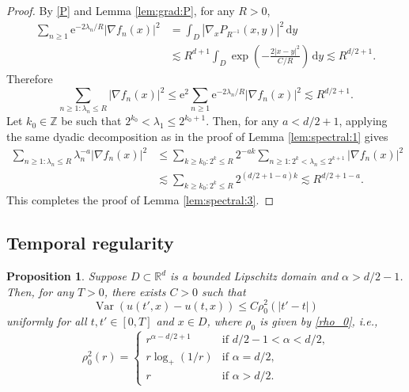 \documentclass[reqno]{amsart}
\DeclareMathOperator{\Var}{Var}
\newcommand{\R}{\mathbb R}
\renewcommand{\d}{\mathrm d}
\newcommand{\e}{\mathrm e}
\newcommand{\1}{\mathbf 1}
\numberwithin{equation}{section}
\newtheorem{proposition}[theorem]{Proposition}
\theoremstyle{definition}
\begin{document}
\begin{proof}
By \eqref{P} and Lemma \ref{lem:grad:P}, for any $R > 0$,
\[
\begin{aligned}
    \sum_{n \ge 1}\e^{-2\lambda_n/R}|\nabla f_n(x)|^2
    &=
    \int_D|\nabla_x P_{R^{-1}}(x,y)|^2\,\d y        \\
    &\lesssim
    R^{d+1}
    \int_D
    \exp\left(-\frac{2|x-y|^2}{C/R}\right)\,\d y    
    \lesssim R^{d/2+1}.
\end{aligned}
\]
Therefore
\[
    \sum_{n \ge 1: \lambda_n\le R}|\nabla f_n(x)|^2
    \le
    \e^2\sum_{n \ge 1} \e^{-2\lambda_n/R}|\nabla f_n(x)|^2
    \lesssim R^{d/2+1}.
\]
Let $k_0 \in \mathbb{Z}$ be such that $2^{k_0} < \lambda_1 \le 2^{k_0+1}$.
Then, for any $a<d/2+1$, applying the same dyadic decomposition as in the proof of Lemma \ref{lem:spectral:1} gives
\[
\begin{aligned}
    \sum_{n \ge 1: \lambda_n\le R}
    \lambda_n^{-a}|\nabla f_n(x)|^2
    &\le \sum_{k \ge k_0: 2^k \le R} 2^{-ak} \sum_{n \ge 1: 2^k < \lambda_n \le 2^{k+1}} |\nabla f_n(x)|^2\\
    & \lesssim \sum_{k \ge k_0: 2^k \le R} 2^{(d/2+1-a)k}  \lesssim R^{d/2+1-a}.
\end{aligned}
\]
This completes the proof of Lemma \ref{lem:spectral:3}.
\end{proof}


\subsection{Temporal regularity}


\begin{proposition}\label{prop:u-u:t}
Suppose $D \subset \R^d$ is a bounded Lipschitz domain and $\alpha>d/2-1$.
Then, for any $T>0$, there exists $C>0$ such that
\[
	\Var(u(t',x)-u(t,x)) \le C \rho_0^2(|t'-t|)
\]
uniformly for all $t,t' \in [0,T]$ and $x \in D$, where $\rho_0$ is given by \eqref{rho_0}, i.e.,
\[
	\rho_0^2(r) = \begin{cases}
	r^{\alpha-d/2+1} & \text{if $d/2-1<\alpha<d/2$,}\\
	r \log_+(1/r) & \text{if $\alpha=d/2$,}\\
	r & \text{if $\alpha>d/2$.}
	\end{cases}
\]
\end{proposition}
\end{document}
